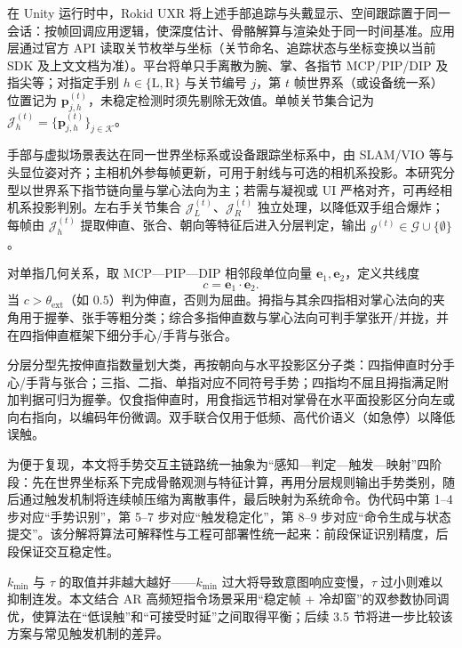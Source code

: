 在 Unity 运行时中，Rokid UXR 将上述手部追踪与头戴显示、空间跟踪置于同一会话：按帧回调应用逻辑，使深度估计、骨骼解算与渲染处于同一时间基准。应用层通过官方 API 读取关节枚举与坐标（关节命名、追踪状态与坐标变换以当前 SDK 及上文文档为准）。平台将单只手离散为腕、掌、各指节 MCP/PIP/DIP 及指尖等；对指定手别 $h\in\{\mathrm{L},\mathrm{R}\}$ 与关节编号 $j$，第 $t$ 帧世界系（或设备统一系）位置记为 $\mathbf{p}_{j,h}^{(t)}$，未稳定检测时须先剔除无效值。单帧关节集合记为 $\mathcal{J}_h^{(t)}=\{\mathbf{p}_{j,h}^{(t)}\}_{j\in\mathcal{K}}$。

手部与虚拟场景表达在同一世界坐标系或设备跟踪坐标系中，由 SLAM/VIO 等与头显位姿对齐；主相机外参每帧更新，可用于射线与可选的相机系投影。本研究分型以世界系下指节链向量与掌心法向为主；若需与凝视或 UI 严格对齐，可再经相机系投影判别。左右手关节集合 $\mathcal{J}_L^{(t)}$、$\mathcal{J}_R^{(t)}$ 独立处理，以降低双手组合爆炸；每帧由 $\mathcal{J}_h^{(t)}$ 提取伸直、张合、朝向等特征后进入分层判定，输出 $g^{(t)}\in\mathcal{G}\cup\{\emptyset\}$。

对单指几何关系，取 MCP---PIP---DIP 相邻段单位向量 $\mathbf{e}_1,\mathbf{e}_2$，定义共线度
\begin{equation}
  c = \mathbf{e}_1\cdot \mathbf{e}_2.
  \label{eq:finger_collinearity}
\end{equation}
当 $c>\theta_{\mathrm{ext}}$（如 $0.5$）判为伸直，否则为屈曲。拇指与其余四指相对掌心法向的夹角用于握拳、张手等粗分类；综合多指伸直数与掌心法向可判手掌张开/并拢，并在四指伸直框架下细分手心/手背与张合。

分层分型先按伸直指数量划大类，再按朝向与水平投影区分子类：四指伸直时分手心/手背与张合；三指、二指、单指对应不同符号手势；四指均不屈且拇指满足附加判据可归为握拳。仅食指伸直时，用食指远节相对掌骨在水平面投影区分向左或向右指向，以编码年份微调。双手联合仅用于低频、高代价语义（如急停）以降低误触。


为便于复现，本文将手势交互主链路统一抽象为“感知—判定—触发—映射”四阶段：先在世界坐标系下完成骨骼观测与特征计算，再用分层规则输出手势类别，随后通过触发机制将连续帧压缩为离散事件，最后映射为系统命令。伪代码中第 1--4 步对应“手势识别”，第 5--7 步对应“触发稳定化”，第 8--9 步对应“命令生成与状态提交”。该分解将算法可解释性与工程可部署性统一起来：前段保证识别精度，后段保证交互稳定性。

$k_{\min}$ 与 $\tau$ 的取值并非越大越好——$k_{\min}$ 过大将导致意图响应变慢，$\tau$ 过小则难以抑制连发。本文结合 AR 高频短指令场景采用“稳定帧 + 冷却窗”的双参数协同调优，使算法在“低误触”和“可接受时延”之间取得平衡；后续 3.5 节将进一步比较该方案与常见触发机制的差异。

